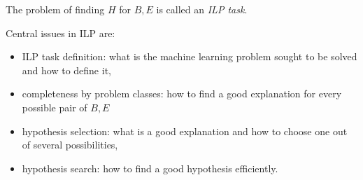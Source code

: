 The problem of finding $H$ for $B, E$ is called an \emph{ILP task}.

Central issues in ILP are:
\begin{itemize}
\item ILP task definition: what is the machine learning problem sought to be solved and how to define it,
\item completeness by problem classes: how to find a good explanation for every possible pair of $B, E$
\item hypothesis selection: what is a good explanation and how to choose one out of several possibilities,
\item hypothesis search: how to find a good hypothesis efficiently.
\end{itemize}
